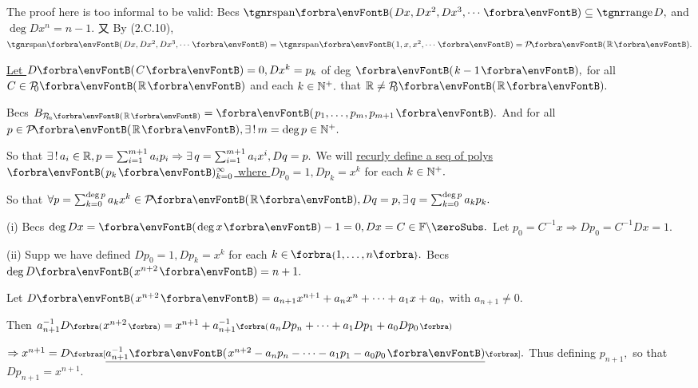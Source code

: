 \! \;The proof here is too informal to be valid:\parSol{}
Becs $\Span{Dx,Dx^2,Dx^3,\cdots}\subseteq\range D,$ and $\deg Dx^n=n-1.$\parSol{}
又 By (2.C.10), $\Span{Dx,Dx^2,Dx^3,\cdots}=\Span{1,x,x^2,\cdots}=\PoRi.$\par\vspace{4pt}\quad
\uline{Let $D\Par{C}=0,Dx^k=p_k$} of deg $\Par{k-1},$ for all $C\in\PoR{0}$ and each $k\in{\mathbb{N}^+}.$ \NOTICE that $\Rbb\neq\PoR{0}.$\par\quad
Becs $B_{\PoR[\SmallPar]{m}}=\Par{p_1,\dots,p_m,p_{m+1}}.$ And for all $p\in\PoRi,\exists\,!\,m=\deg p\in\Nbp.$\par\quad
So that $\exists\,!\,a_i\in{\mathbb{R}},p=\sum_{i=1}^{m+1}a_ip_i\Rightarrow\exists\,q=\sum_{i=1}^{m+1}a_{i}x^{i},Dq=p.$\PfEnd\vspace{6pt}\quad
{\Or We will \uline{recurly define a seq of polys $\Par{p_k}{_{k=0}^\infty}$ where $Dp_0=1,Dp_k=x^k$} for each $k\in{\mathbb{N}^+}.$}\par\vspace{2pt}\quad
{\FontSmall So that $\forall p=\sum_{k=0}^{\deg p}a_k x^k\in\PoRi,Dq=p,\exists\,q={\sum_{k=0}^{\deg p}a_k p_k}.$}\par\vspace{4pt}\quad
(i) {Becs $\deg Dx=\Par{\!\deg x}-1=0,Dx=C\in\nonzeroFbb.$ Let $p_0=C^{-1}x\Rightarrow Dp_0=C^{-1}Dx=1.$}\vspace{2pt}\par\quad\Endi
(ii) {Supp we have defined $Dp_0=1,Dp_k=x^k$ for each $k\in\;\!\!\Bra{1,\dots,n}.$ Becs $\deg D\Par{x^{n+2}}=n+1.$}\vspace{2pt}\par\quad\Hii
{Let {\;$D\Par{x^{n+2}}=a_{n+1}x^{n+1}+a_n x^n+\dots+a_1 x+a_0,$} with $a_{n+1}\neq 0.$}\vspace{2pt}\par\quad\Hii
{Then {\;$a_{n+1}^{-1}D\BigPar{x^{n+2}}=x^{n+1}+a_{n+1}^{-1}\BigPar{a_n Dp_n+\dots+a_1 Dp_1 +a_0 Dp_0}$}}\vspace{2pt}\par\quad\Hii
{$\Rightarrow x^{n+1}=D\XSbra{\uline{a_{n+1}^{-1}\Par{x^{n+2}-a_n p_n-\dots-a_1 p_1-a_0 p_0}}}.$ Thus defining $p_{n+1},$ so that $Dp_{n+1}=x^{n+1}.$}\PfEnd
\SepLine

